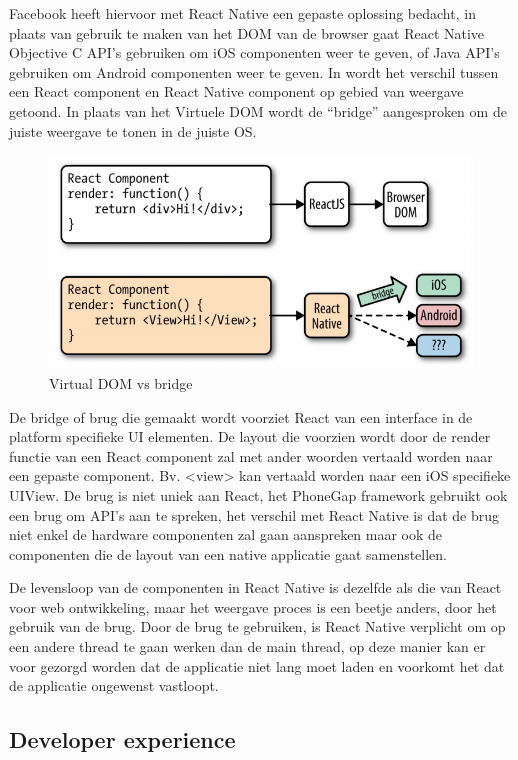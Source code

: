 Facebook heeft hiervoor met React Native een gepaste oplossing bedacht, in plaats van gebruik te maken van het DOM van de browser gaat React Native Objective C API’s gebruiken om iOS componenten weer te geven, of Java API’s gebruiken om Android componenten weer te geven.  In  wordt het verschil tussen een React component en React Native component op gebied van weergave getoond. In plaats van het Virtuele DOM wordt de “bridge” aangesproken om de juiste weergave te tonen in de juiste OS.  

	\begin{figure}
		\centering
		\includegraphics[width=\columnwidth]{img/bridge.png}
		\caption{Virtual DOM vs bridge}
		\label{fig:dombridge}
	\end{figure}


De bridge of brug die gemaakt wordt voorziet React van een interface in de platform specifieke UI elementen. De layout die voorzien wordt door de render functie van een React component zal met ander woorden vertaald worden naar een gepaste component. Bv. <view> kan vertaald worden naar een iOS specifieke UIView. De brug is niet uniek aan React, het PhoneGap framework gebruikt ook een brug om API’s aan te spreken, het verschil met React Native is dat de brug niet enkel de hardware componenten zal gaan aanspreken maar ook de componenten die de layout van een native applicatie gaat samenstellen.

De levensloop van de componenten in React Native is dezelfde als die van React voor web ontwikkeling, maar het weergave proces is een beetje anders, door het gebruik van de brug. Door de brug te gebruiken, is React Native verplicht om op een andere thread te gaan werken dan de main thread, op deze manier kan er voor gezorgd worden dat de applicatie niet lang moet laden en voorkomt het dat de applicatie ongewenst vastloopt.

\subsection{Developer experience}

